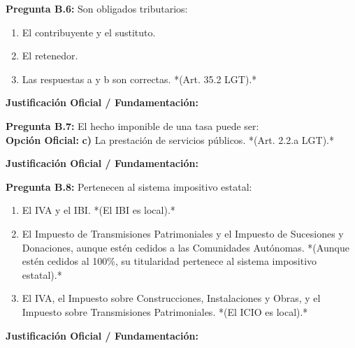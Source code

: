 \documentclass[11pt,a4paper,openany]{article}
\begin{document}
\noindent\textbf{\sffamily Pregunta B.6:} Son obligados tributarios:\\[0.15cm]
\begin{enumerate}[label=\textbf{\alph*)},leftmargin=1.8em,itemsep=1.5pt,topsep=2pt,partopsep=0pt,parsep=0pt]
    \item El contribuyente y el sustituto.
    \item El retenedor.
    \item Las respuestas a y b son correctas. *(Art. 35.2 LGT).*
\end{enumerate}
\begin{solucionBox}
\textbf{Justificación Oficial / Fundamentación:}\\[0.1cm]

\end{solucionBox}
\vspace{0.35cm}

\noindent\textbf{\sffamily Pregunta B.7:} El hecho imponible de una tasa puede ser:\\[0.15cm]
\noindent\textbf{Opción Oficial:} \textbf{c)} La prestación de servicios públicos. *(Art. 2.2.a LGT).*\\[0.15cm]
\begin{solucionBox}
\textbf{Justificación Oficial / Fundamentación:}\\[0.1cm]

\end{solucionBox}
\vspace{0.35cm}

\noindent\textbf{\sffamily Pregunta B.8:} Pertenecen al sistema impositivo estatal:\\[0.15cm]
\begin{enumerate}[label=\textbf{\alph*)},leftmargin=1.8em,itemsep=1.5pt,topsep=2pt,partopsep=0pt,parsep=0pt]
    \item El IVA y el IBI. *(El IBI es local).*
    \item El Impuesto de Transmisiones Patrimoniales y el Impuesto de Sucesiones y Donaciones, aunque estén cedidos a las Comunidades Autónomas. *(Aunque estén cedidos al 100\%, su titularidad pertenece al sistema impositivo estatal).*
    \item El IVA, el Impuesto sobre Construcciones, Instalaciones y Obras, y el Impuesto sobre Transmisiones Patrimoniales. *(El ICIO es local).*
\end{enumerate}
\begin{solucionBox}
\textbf{Justificación Oficial / Fundamentación:}\\[0.1cm]

\end{solucionBox}
\vspace{0.35cm}
\end{document}
